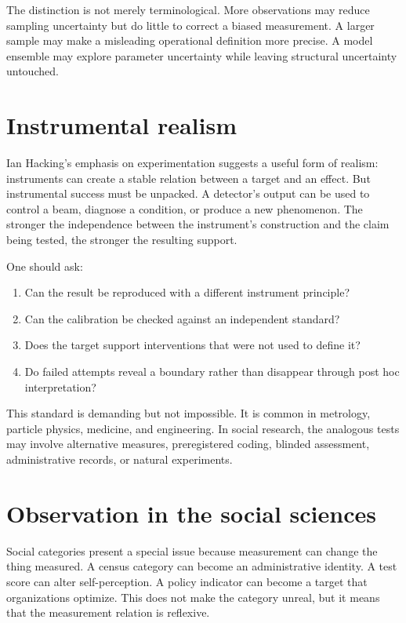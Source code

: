 The distinction is not merely terminological. More observations may reduce
sampling uncertainty but do little to correct a biased measurement. A larger
sample may make a misleading operational definition more precise. A model
ensemble may explore parameter uncertainty while leaving structural uncertainty
untouched.

\section{Instrumental realism}

Ian Hacking's emphasis on experimentation suggests a useful form of realism:
instruments can create a stable relation between a target and an effect. But
instrumental success must be unpacked. A detector's output can be used to
control a beam, diagnose a condition, or produce a new phenomenon. The stronger
the independence between the instrument's construction and the claim being
tested, the stronger the resulting support.

One should ask:

\begin{enumerate}
\item Can the result be reproduced with a different instrument principle?
\item Can the calibration be checked against an independent standard?
\item Does the target support interventions that were not used to define it?
\item Do failed attempts reveal a boundary rather than disappear through
post hoc interpretation?
\end{enumerate}

This standard is demanding but not impossible. It is common in metrology,
particle physics, medicine, and engineering. In social research, the analogous
tests may involve alternative measures, preregistered coding, blinded
assessment, administrative records, or natural experiments.

\section{Observation in the social sciences}

Social categories present a special issue because measurement can change the
thing measured. A census category can become an administrative identity. A
test score can alter self-perception. A policy indicator can become a target
that organizations optimize. This does not make the category unreal, but it
means that the measurement relation is reflexive.

